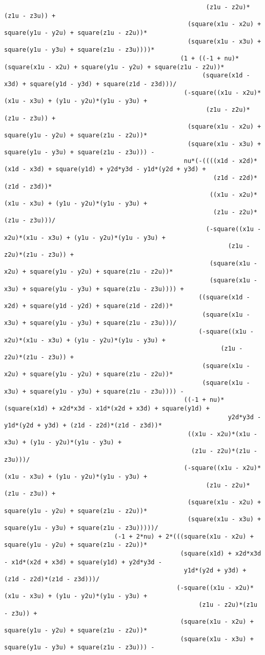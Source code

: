 \begin{lstlisting}
													   (z1u - z2u)*(z1u - z3u)) + 
												  (square(x1u - x2u) + square(y1u - y2u) + square(z1u - z2u))*
												  (square(x1u - x3u) + square(y1u - y3u) + square(z1u - z3u))))*
												(1 + ((-1 + nu)*(square(x1u - x2u) + square(y1u - y2u) + square(z1u - z2u))*
													  (square(x1d - x3d) + square(y1d - y3d) + square(z1d - z3d)))/
												 (-square((x1u - x2u)*(x1u - x3u) + (y1u - y2u)*(y1u - y3u) + 
													   (z1u - z2u)*(z1u - z3u)) + 
												  (square(x1u - x2u) + square(y1u - y2u) + square(z1u - z2u))*
												  (square(x1u - x3u) + square(y1u - y3u) + square(z1u - z3u))) - 
												 nu*(-((((x1d - x2d)*(x1d - x3d) + square(y1d) + y2d*y3d - y1d*(y2d + y3d) + 
														 (z1d - z2d)*(z1d - z3d))*
														((x1u - x2u)*(x1u - x3u) + (y1u - y2u)*(y1u - y3u) + 
														 (z1u - z2u)*(z1u - z3u)))/
													   (-square((x1u - x2u)*(x1u - x3u) + (y1u - y2u)*(y1u - y3u) + 
															 (z1u - z2u)*(z1u - z3u)) + 
														(square(x1u - x2u) + square(y1u - y2u) + square(z1u - z2u))*
														(square(x1u - x3u) + square(y1u - y3u) + square(z1u - z3u)))) + 
													 ((square(x1d - x2d) + square(y1d - y2d) + square(z1d - z2d))*
													  (square(x1u - x3u) + square(y1u - y3u) + square(z1u - z3u)))/
													 (-square((x1u - x2u)*(x1u - x3u) + (y1u - y2u)*(y1u - y3u) + 
														   (z1u - z2u)*(z1u - z3u)) + 
													  (square(x1u - x2u) + square(y1u - y2u) + square(z1u - z2u))*
													  (square(x1u - x3u) + square(y1u - y3u) + square(z1u - z3u)))) - 
												 ((-1 + nu)*(square(x1d) + x2d*x3d - x1d*(x2d + x3d) + square(y1d) + 
															 y2d*y3d - y1d*(y2d + y3d) + (z1d - z2d)*(z1d - z3d))*
												  ((x1u - x2u)*(x1u - x3u) + (y1u - y2u)*(y1u - y3u) + 
												   (z1u - z2u)*(z1u - z3u)))/
												 (-square((x1u - x2u)*(x1u - x3u) + (y1u - y2u)*(y1u - y3u) + 
													   (z1u - z2u)*(z1u - z3u)) + 
												  (square(x1u - x2u) + square(y1u - y2u) + square(z1u - z2u))*
												  (square(x1u - x3u) + square(y1u - y3u) + square(z1u - z3u)))))/
							  (-1 + 2*nu) + 2*(((square(x1u - x2u) + square(y1u - y2u) + square(z1u - z2u))*
												(square(x1d) + x2d*x3d - x1d*(x2d + x3d) + square(y1d) + y2d*y3d - 
												 y1d*(y2d + y3d) + (z1d - z2d)*(z1d - z3d)))/
											   (-square((x1u - x2u)*(x1u - x3u) + (y1u - y2u)*(y1u - y3u) + 
													 (z1u - z2u)*(z1u - z3u)) + 
												(square(x1u - x2u) + square(y1u - y2u) + square(z1u - z2u))*
												(square(x1u - x3u) + square(y1u - y3u) + square(z1u - z3u))) - 

\end{lstlisting}
